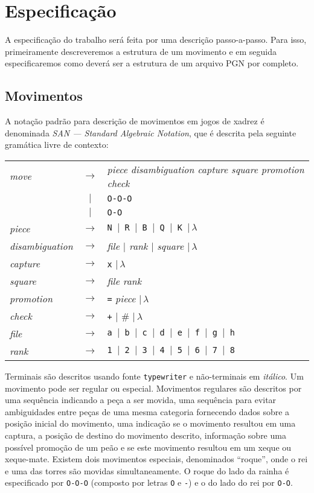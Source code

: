 \documentclass[11pt,a4paper]{article}
\begin{document}
\section{Especifica\c{c}\~ao}

A especifica\c{c}\~ao do trabalho ser\'a feita por uma descri\c{c}\~ao 
passo-a-passo. Para isso, primeiramente descreveremos a estrutura de
um movimento e em seguida especificaremos como dever\'a ser a estrutura
de um arquivo PGN por completo.

\subsection{Movimentos}\label{san}

A nota\c{c}\~ao padr\~ao para descri\c{c}\~ao de movimentos em jogos de 
xadrez \'e denominada \textit{SAN --- Standard Algebraic Notation}, que
\'e descrita pela seguinte gram\'atica livre de contexto:

\begin{tabular}{lcl}
	\textit{move} & $\rightarrow$ & \textit{piece disambiguation capture square promotion check}\\
	              & $|$           & \verb|O-O-O| \\
	              & $|$           & \verb|O-O| \\
	\textit{piece} & $\rightarrow$ & \texttt{N $|$ R $|$ B $|$ Q $|$ K $|\,\lambda$}\\
	\textit{disambiguation} & $\rightarrow$ & \textit{file $|$ rank $|$ square $|\,\lambda$}\\
	\textit{capture} & $\rightarrow$ & \texttt{x} $|\,\lambda$\\
	\textit{square} & $\rightarrow$ & \textit{file rank} \\
	\textit{promotion} & $\rightarrow$ & \texttt{=} \textit{piece} $|\,\lambda$\\
	\textit{check} & $\rightarrow$ & \texttt{+} $|$ $\#$ $|\,\lambda$\\
	\textit{file} & $\rightarrow$ & \texttt{a $|$ b $|$ c $|$ d $|$ e $|$ f $|$ g $|$ h}\\
	\textit{rank} & $\rightarrow$ & \texttt{1 $|$ 2 $|$ 3 $|$ 4 $|$ 5 $|$ 6 $|$ 7 $|$ 8}\\
\end{tabular}
Terminais s\~ao descritos usando fonte \texttt{typewriter} e n\~ao-terminais 
em \textit{it\'alico}. Um movimento pode ser regular ou especial. Movimentos
regulares s\~ao descritos por uma sequ\^encia indicando a pe\c{c}a a ser 
movida, uma sequ\^encia para evitar ambiguidades entre pe\c{c}as de uma 
mesma categoria fornecendo dados sobre a posi\c{c}\~ao inicial do 
movimento, uma indica\c{c}\~ao se o movimento resultou em uma captura, 
a posi\c{c}\~ao de destino do movimento descrito, informa\c{c}\~ao sobre
uma poss\'ivel promo\c{c}\~ao de um pe\~ao e se este movimento resultou
em um xeque ou xeque-mate. Existem dois movimentos especiais, denominados
``roque'', onde o rei e uma das torres s\~ao movidas simultaneamente. O 
roque do lado da rainha \'e especificado por \texttt{O-O-O} (composto por
letras \texttt{O} e \texttt{-}) e o do lado do rei por \texttt{O-O}.
\end{document}
